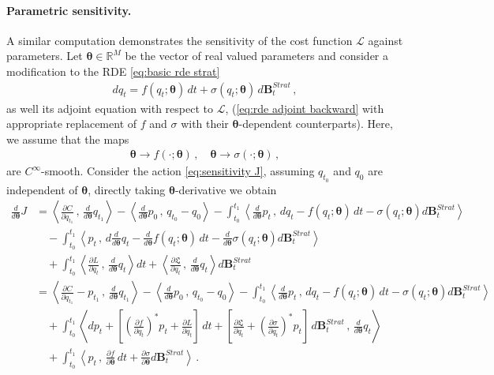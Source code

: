 \documentclass[11pt, oneside]{article}
\numberwithin{equation}{section}
\theoremstyle{definition}
\newcommand{\mc}[1]{\mathcal{#1}}
\newcommand{\bs}[1]{\boldsymbol{#1}}
\newcommand{\mcal}[1]{\mc{#1}}
\newcommand{\scp}[2]{{\left\langle {#1}\, , \, {#2}\right\rangle}}
\def\p{{\partial}}
\def\p{\partial}
\begin{document}
\paragraph{Parametric sensitivity.}
A similar computation demonstrates the sensitivity of the cost function $\mcal{L}$ against parameters. Let $\bs{\theta} \in \mathbb{R}^M$ be the vector of real valued parameters and consider a modification to the RDE \eqref{eq:basic rde strat} 
\begin{align}
    dq_t = f(q_t; \bs{\theta})\,dt + \sigma(q_t; \bs{\theta})\, d\mathbf{B}^{Strat}_t \,,
\end{align}
as well its adjoint equation with respect to $\mcal{L}$, (\eqref{eq:rde adjoint backward} with appropriate replacement of $f$ and $\sigma$ with their $\bs{\theta}$-dependent counterparts). Here, we assume that the maps
\begin{align*}
    \bs{\theta} \rightarrow f(\cdot; \bs{\theta})\,, \quad \bs{\theta} \rightarrow \sigma(\cdot; \bs{\theta})\,,
\end{align*}
are $C^\infty$-smooth.
Consider the action \eqref{eq:sensitivity J}, assuming $q_{t_0}$ and $q_0$ are independent of $\bs{\theta}$, directly taking $\bs{\theta}$-derivative we obtain
\begin{align*}
    \frac{d}{d\bs{\theta}}J &= \scp{\frac{\p C}{\p q_{t_1}}}{\frac{d}{d\bs{\theta}}q_{t_1}} - \scp{\frac{d}{d\bs{\theta}}p_0}{q_{t_0} - q_0} - \int_{t_0}^{t_1}\scp{\frac{d}{d\bs{\theta}}p_t}{dq_t - f(q_t;\bs{\theta})\,dt - \sigma(q_t;\bs{\theta})d\mathbf{B}^{Strat}_t}\\
    & \quad - \int_{t_0}^{t_1}\scp{p_t}{d \frac{d}{d\bs{\theta}}q_t - \frac{d}{d\bs{\theta}}f(q_t;\bs{\theta})\,dt - \frac{d}{d\bs{\theta}}\sigma(q_t;\bs{\theta})d\mathbf{B}^{Strat}_t} \\
    &\quad + \int_{t_0}^{t_1}\scp{\frac{\p L}{\p q_t}}{\frac{d}{d\bs{\theta}}q_t}dt + \scp{\frac{\p \mathfrak{L}}{\p q_t}}{\frac{d}{d\bs{\theta}}q_t}d\mathbf{B}^{Strat}_t\\
    &= \scp{\frac{\p C}{\p q_{t_1}}- p_{t_1}}{\frac{d}{d\bs{\theta}}q_{t_1}} - \scp{\frac{d}{d\bs{\theta}}p_0}{q_{t_0} - q_0} - \int_{t_0}^{t_1}\scp{\frac{d}{d\bs{\theta}}p_t}{dq_t - f(q_t;\bs{\theta})\,dt - \sigma(q_t;\bs{\theta})d\mathbf{B}^{Strat}_t}\\
    & \quad + \int_{t_0}^{t_1}\scp{d p_t + \left[\left(\frac{\p f}{\p q_t}\right)^* p_t + \frac{\p L}{\p q_t}\right]\,dt + \left[\frac{\p \mathfrak{L}}{\p q_t} + \left(\frac{\p \sigma}{\p q_t}\right)^* p_t \right]\,d\mathbf{B}^{Strat}_t}{\frac{d}{d\bs{\theta}}q_t} \\
    & \quad + \int_{t_0}^{t_1}\scp{p_t}{\frac{\p f}{\p \bs{\theta}}\,dt + \frac{\p \sigma}{\p \bs{\theta}}d\mathbf{B}^{Strat}_t}\,.
\end{align*}
\end{document}

